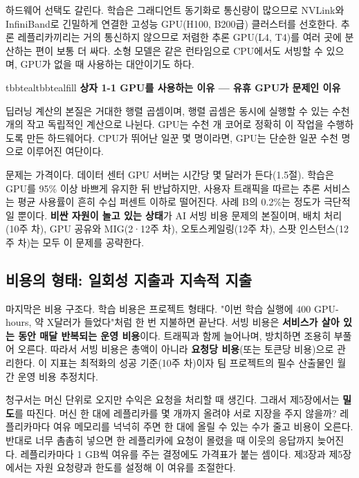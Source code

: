 하드웨어 선택도 갈린다. 학습은 그래디언트 동기화로 통신량이 많으므로 NVLink와 InfiniBand로 긴밀하게 연결한 고성능 GPU(H100, B200급) 클러스터를 선호한다. 추론 레플리카끼리는 거의 통신하지 않으므로 저렴한 추론 GPU(L4, T4)를 여러 곳에 분산하는 편이 보통 더 싸다. 소형 모델은  같은 런타임으로 CPU에서도 서빙할 수 있으며, GPU가 없을 때 사용하는 대안이기도 하다.

\begin{calloutbox}{tbbteal}{tbbtealfill}
{\normalsize\bfseries\color{tbbx115E59}상자 1-1  GPU를 사용하는 이유 — 유휴 GPU가 문제인 이유}\par\vspace{3pt}
딥러닝 계산의 본질은 거대한 행렬 곱셈이며, 행렬 곱셈은 동시에 실행할 수 있는 수천 개의 작고 독립적인 계산으로 나뉜다. GPU는 수천 개 코어로 정확히 이 작업을 수행하도록 만든 하드웨어다. CPU가 뛰어난 일꾼 몇 명이라면, GPU는 단순한 일꾼 수천 명으로 이루어진 여단이다.

문제는 가격이다. 데이터 센터 GPU 서버는 시간당 몇 달러가 든다(1.5절). 학습은 GPU를 95\% 이상 바쁘게 유지한 뒤 반납하지만, 사용자 트래픽을 따르는 추론 서비스는 평균 사용률이 흔히 수십 퍼센트 이하로 떨어진다. 사례 B의 0.2\%는 정도가 극단적일 뿐이다. \textbf{비싼 자원이 놀고 있는 상태}가 AI 서빙 비용 문제의 본질이며, 배치 처리(10주 차), GPU 공유와 MIG(2·12주 차), 오토스케일링(12주 차), 스팟 인스턴스(12주 차)는 모두 이 문제를 공략한다.
\end{calloutbox}

\vspace{3.0pt}

\subsection*{비용의 형태: 일회성 지출과 지속적 지출}

마지막은 비용 구조다. 학습 비용은 프로젝트 형태다. "이번 학습 실행에 400 GPU-hours, 약 X달러가 들었다"처럼 한 번 지불하면 끝난다. 서빙 비용은 \textbf{서비스가 살아 있는 동안 매달 반복되는 운영 비용}이다. 트래픽과 함께 늘어나며, 방치하면 조용히 부풀어 오른다. 따라서 서빙 비용은 총액이 아니라 \textbf{요청당 비용}(또는 토큰당 비용)으로 관리한다. 이 지표는 최적화의 성공 기준(10주 차)이자 팀 프로젝트의 필수 산출물인 월간 운영 비용 추정치다.

청구서는 머신 단위로 오지만 수익은 요청을 처리할 때 생긴다. 그래서 제5장에서는 \textbf{밀도}를 따진다. 머신 한 대에 레플리카를 몇 개까지 올려야 서로 지장을 주지 않을까? 레플리카마다 여유 메모리를 넉넉히 주면 한 대에 올릴 수 있는 수가 줄고 비용이 오른다. 반대로 너무 촘촘히 넣으면 한 레플리카에 요청이 몰렸을 때 이웃의 응답까지 늦어진다. 레플리카마다 1 GB씩 여유를 주는 결정에도 가격표가 붙는 셈이다. 제3장과 제5장에서는 자원 요청량과 한도를 설정해 이 여유를 조절한다.

